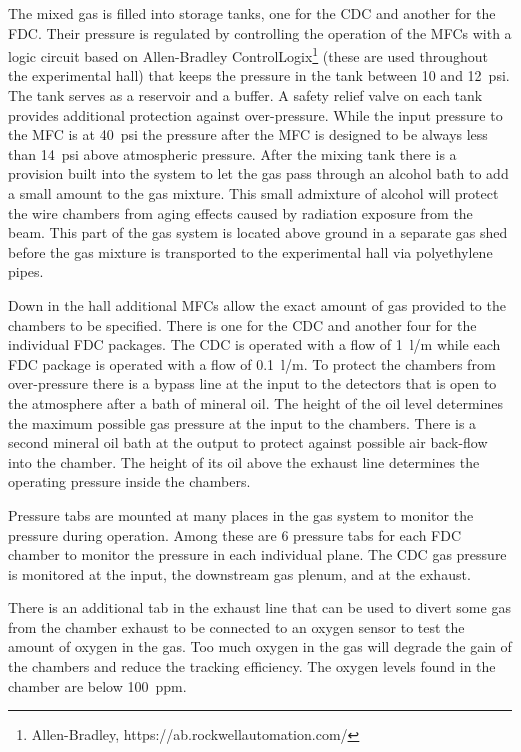 The mixed gas is filled into storage tanks, one for the CDC and another for the FDC. Their pressure is
regulated by controlling the operation of the MFCs with a logic circuit based on Allen-Bradley ControlLogix\footnote{Allen-Bradley, https://ab.rockwellautomation.com/}
 (these are used throughout the experimental hall) that keeps
the pressure in the tank between 10 and 12~psi. The tank serves as a reservoir and a buffer.
A safety relief valve on each tank
provides additional protection against over-pressure. While the input pressure to the MFC is at 40~psi the pressure after
the MFC is designed to be always less than 14~psi above atmospheric pressure. After the mixing tank there is a provision
built into the system to let the gas pass through an alcohol bath to add a small amount to the gas mixture.
This small admixture of alcohol will protect the wire chambers from aging effects caused by radiation exposure from the beam.
This part of the gas system is located above ground in a separate gas shed before the gas mixture is transported
to the experimental hall via polyethylene pipes.

Down in the hall additional MFCs allow the exact amount of gas provided to the chambers to be specified. There is one for the CDC and another 
four for the individual FDC packages. The CDC is operated with a flow of 1~l/m while each FDC package is operated with
a flow of 0.1~l/m. To protect the chambers from over-pressure there is a bypass line at the input to the detectors that
is open to the atmosphere after a bath of mineral oil. The height of the oil level determines the maximum possible gas pressure at
the input to the chambers. There is a second mineral oil bath at the output to protect against possible air back-flow into
the chamber. The height of its oil above the exhaust line determines the operating pressure inside the chambers.

Pressure tabs are mounted at many places in the gas system to monitor the pressure during operation. Among these are
6 pressure tabs for each FDC chamber to monitor the pressure in each individual plane. The CDC gas pressure is monitored
at the input, the downstream gas plenum, and at the exhaust.

There is an additional tab in the exhaust line that can be used to divert some gas from the chamber exhaust to be connected
to an oxygen sensor to test the amount of oxygen in the gas. Too much oxygen in the gas will degrade the gain of
the chambers and reduce the tracking efficiency. The oxygen levels found in the chamber are below 100~ppm. 

